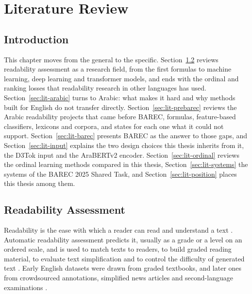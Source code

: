\chapter{Literature Review}
\label{chap:relatedwork}

\section{Introduction}

This chapter moves from the general to the specific. Section~\ref{sec:lit-readability} reviews
readability assessment as a research field, from the first formulas to machine learning, deep
learning and transformer models, and ends with the ordinal and ranking losses that readability
research in other languages has used. Section~\ref{sec:lit-arabic} turns to Arabic: what makes
it hard and why methods built for English do not transfer directly.
Section~\ref{sec:lit-prebarec} reviews the Arabic readability projects that came before BAREC,
formulas, feature-based classifiers, lexicons and corpora, and states for each one what it could
not support. Section~\ref{sec:lit-barec} presents BAREC as the answer to those gaps, and
Section~\ref{sec:lit-input} explains the two design choices this thesis inherits from it, the
D3Tok input and the AraBERTv2 encoder. Section~\ref{sec:lit-ordinal} reviews the ordinal
learning methods compared in this thesis, Section~\ref{sec:lit-systems} the systems of the BAREC
2025 Shared Task, and Section~\ref{sec:lit-position} places this thesis among them.

\section{Readability Assessment}
\label{sec:lit-readability}

Readability is the ease with which a reader can read and understand a text
\cite{dubay2004principles}. Automatic readability assessment predicts it, usually as a grade or a
level on an ordered scale, and is used to match texts to readers, to build graded reading
material, to evaluate text simplification and to control the difficulty of generated text
\cite{collins2014computational,vajjala2022trends,xu-etal-2015-problems,agrawal2019controlling}.
Early English datasets were drawn from graded textbooks, and later ones from crowdsourced
annotations, simplified news articles and second-language examinations
\cite{vajjala2012readability,xu-etal-2015-problems,xia2016readability,vajjala2022trends}.

